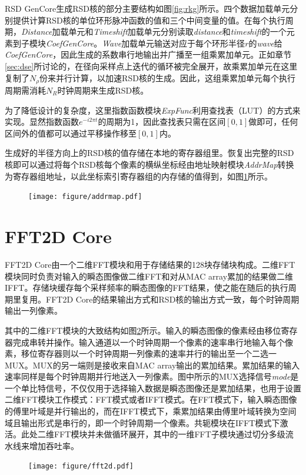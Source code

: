 \documentclass[master]{shtthesis}             %
\begin{document}
RSD GenCore生成RSD核的部分主要结构如图\ref{fig:rkg}所示。四个数据加载单元分别提供计算RSD核的单位环形脉冲函数的值和三个中间变量的值。在每个执行周期，\textit{Distance}加载单元和\textit{Timeshift}加载单元分别读取\textit{distance}和\textit{timeshift}的一个元素到子模块\textit{CoefGenCore}。\textit{Wave}加载单元输送对应于每个环形半径$r$的\textit{wave}给\textit{CoefGenCore}，因此生成的系数串行地输出并广播至一组乘累加单元。正如章节\ref{sec:dse}所讨论的，在径向采样点上迭代的循环被完全展开，故乘累加单元在这里复制了$N_\rho$份来并行计算，以加速RSD核的生成。因此，这组乘累加单元每个执行周期需消耗$N_R$时钟周期来生成RSD核。

为了降低设计的复杂度，这里指数函数模块\textit{ExpFunc}利用查找表（LUT）的方式来实现。显然指数函数$e^{-i2\pi t}$的周期为1，因此查找表只需在区间$[0,1]$做即可，任何区间外的值都可以通过平移操作移至$[0,1]$内。

生成好的半径方向上的RSD核的值存储在本地的寄存器组里。恢复出完整的RSD核即可以通过将每个RSD核每个像素的横纵坐标经由地址映射模块\textit{AddrMap}转换为寄存器组地址，以此坐标索引寄存器组的内存储的值得到，如图\ref{fig:addrmap}所示。
\begin{figure}[!tb]
    \centering
    \texttt{[image: figure/addrmap.pdf]}
    \label{fig:addrmap}
\end{figure}

\section{FFT2D Core}

FFT2D Core由一个二维FFT模块和用于存储结果的128块存储块构成。二维FFT模块同时负责对输入的瞬态图像做二维FFT和对从MAC array累加的结果做二维IFFT。存储块缓存每个采样频率的瞬态图像的FFT结果，使之能在随后的执行周期里复用。FFT2D Core的结果输出方式和RSD核的输出方式一致，每个时钟周期输出一列像素。

其中的二维FFT模块的大致结构如图\ref{fig:fft_arch}所示。输入的瞬态图像的像素经由移位寄存器完成串转并操作。输入通道以一个时钟周期一个像素的速率串行地输入每个像素，移位寄存器则以一个时钟周期一列像素的速率并行的输出至一个二选一MUX。MUX的另一端则是接收来自MAC array输出的累加结果。累加结果的输入速率同样是每个时钟周期并行地送入一列像素。图中所示的MUX选择信号\textit{mode}是一个单比特信号，不仅仅用于选择输入数据是瞬态图像还是累加结果，也用于设置二维FFT模块工作模式：FFT模式或者IFFT模式。在FFT模式下，输入瞬态图像的傅里叶域是并行输出的，而在IFFT模式下，乘累加结果由傅里叶域转换为空间域且输出形式是串行的，即一个时钟周期一个像素。共轭模块在IFFT模式下激活。此处二维FFT模块并未做循环展开，其中的一维FFT子模块通过切分多级流水线来增加吞吐率。
\begin{figure}[!tb]
    \centering
    \texttt{[image: figure/fft2d.pdf]}
    \label{fig:fft_arch}
\end{figure}
\end{document}
